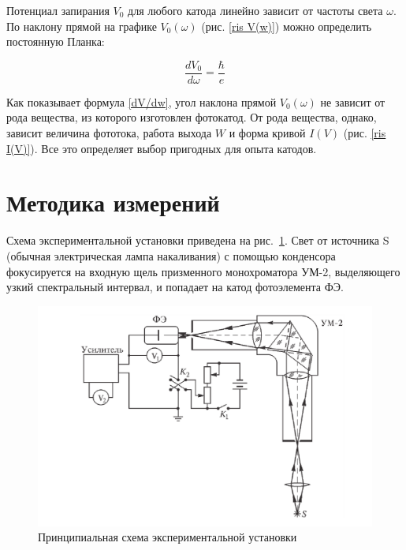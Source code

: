 \documentclass[a4paper, 12pt]{article}
\begin{document}
	Потенциал запирания $ V_0 $ для любого катода линейно зависит от
	частоты света $ \omega $. По наклону прямой на графике $ V_0(\omega) $ (рис. \ref{ris V(w)}) можно определить постоянную Планка:
	
	\begin{equation}\label{dV/dw}
	\dfrac{dV_0}{d\omega} = \dfrac{\hbar}{e}
	\end{equation}
	
	Как показывает формула \eqref{dV/dw}, угол наклона прямой $ V_0(\omega) $ не зависит от рода вещества, из которого изготовлен фотокатод. От рода вещества, однако, зависит величина фототока, работа выхода $ W $ и форма кривой $ I(V) $ (рис. \ref{ris I(V)}). Все это определяет выбор пригодных для
	опыта катодов.

\section{Методика измерений}

Схема экспериментальной установки приведена на рис.~\ref{fig:ust}. Свет от
источника S (обычная электрическая лампа накаливания) с помощью
конденсора фокусируется на входную щель призменного монохроматора
УМ-2, выделяющего узкий спектральный интервал, и попадает на катод
фотоэлемента ФЭ.

\begin{figure}[h]
\begin{center}
\includegraphics[width = \textwidth]{ust.png}
\caption{Принципиальная схема экспериментальной установки}
\label{fig:ust}
\end{center}
\end{figure}
\end{document}
